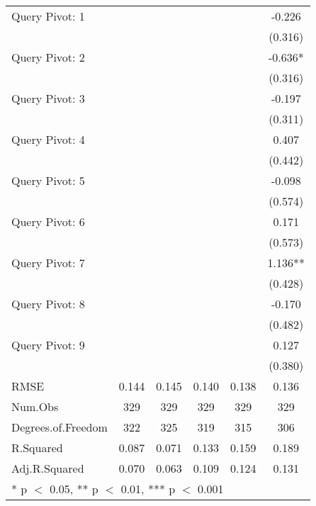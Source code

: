 \begin{table}
\begin{tabular}[t]{lccccc}
Query Pivot: 1 &  &  &  &  & -0.226\\
 &  &  &  &  & \vphantom{1} (0.316)\\
Query Pivot: 2 &  &  &  &  & -0.636*\\
 &  &  &  &  & (0.316)\\
Query Pivot: 3 &  &  &  &  & -0.197\\
 &  &  &  &  & (0.311)\\
Query Pivot: 4 &  &  &  &  & 0.407\\
 &  &  &  &  & (0.442)\\
Query Pivot: 5 &  &  &  &  & -0.098\\
 &  &  &  &  & (0.574)\\
Query Pivot: 6 &  &  &  &  & 0.171\\
 &  &  &  &  & (0.573)\\
Query Pivot: 7 &  &  &  &  & 1.136**\\
 &  &  &  &  & (0.428)\\
Query Pivot: 8 &  &  &  &  & -0.170\\
 &  &  &  &  & (0.482)\\
Query Pivot: 9 &  &  &  &  & 0.127\\
 &  &  &  &  & (0.380)\\
\midrule
RMSE & 0.144 & 0.145 & 0.140 & 0.138 & 0.136\\
Num.Obs & 329 & 329 & 329 & 329 & 329\\
Degrees.of.Freedom & 322 & 325 & 319 & 315 & 306\\
R.Squared & 0.087 & 0.071 & 0.133 & 0.159 & 0.189\\
Adj.R.Squared & 0.070 & 0.063 & 0.109 & 0.124 & 0.131\\
\bottomrule
\multicolumn{6}{l}{\rule{0pt}{1em}* p $<$ 0.05, ** p $<$ 0.01, *** p $<$ 0.001}\\
\end{tabular}
\end{table}
